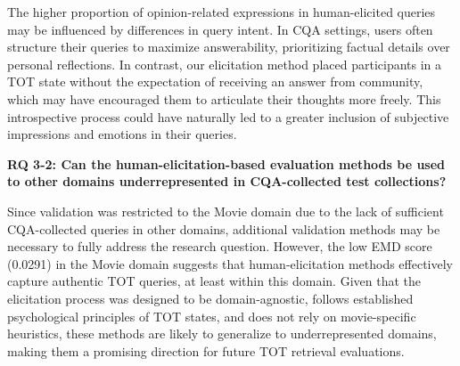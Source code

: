 The higher proportion of opinion-related expressions in human-elicited queries may be influenced by differences in query intent. In CQA settings, users often structure their queries to maximize answerability, prioritizing factual details over personal reflections. In contrast, our elicitation method placed participants in a TOT state without the expectation of receiving an answer from community, which may have encouraged them to articulate their thoughts more freely. This introspective process could have naturally led to a greater inclusion of subjective impressions and emotions in their queries.




\textbf{RQ 3-2: Can the human-elicitation-based evaluation methods be used to other domains underrepresented in CQA-collected test collections?}

Since validation was restricted to the Movie domain due to the lack of sufficient CQA-collected queries in other domains, additional validation methods may be necessary to fully address the research question. However, the low EMD score (0.0291) in the Movie domain suggests that human-elicitation methods effectively capture authentic TOT queries, at least within this domain. Given that the elicitation process was designed to be domain-agnostic, follows established psychological principles of TOT states, and does not rely on movie-specific heuristics, these methods are likely to generalize to underrepresented domains, making them a promising direction for future TOT retrieval evaluations.
